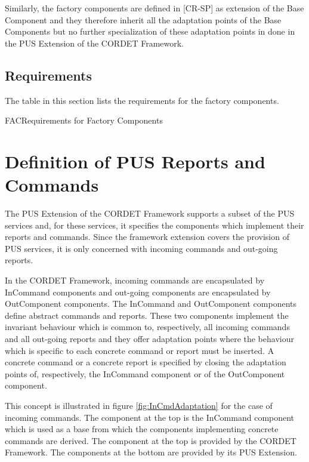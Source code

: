 \documentclass[a4paper,10pt]{article}
\let\stdsection\section
\renewcommand\section{\newpage\stdsection}
\newenvironment{cr_req}[2]
{
\begin{longtable}{|l|p{11.8cm}|}
\caption{#2}\label{tab:Req-#1} \\
\hline
\rowcolor{light-gray}
\textbf{Req. ID} & \textbf{Requirement Text}\\
\hline\hline
\endfirsthead
\rowcolor{light-gray}
\textbf{Req. ID} & \textbf{Requirement Text}\\
\hline\hline
\endhead
\DTLforeach*[\DTLiseq{\cat}{#1}]{dbReq}{\cat=Category,\type=Type,\id=Id,\reqText=Text}
{\DTLiffirstrow{}{\\\hline}P-\cat-\id/\type & \textit{\reqText}}\\\hline
}
{\end{longtable}}
\begin{document}
Similarly, the factory components are defined in [CR-SP] as extension of the Base Component and they therefore inherit all the adaptation points of the Base Components but no further specialization of these adaptation points in done in the PUS Extension of the CORDET Framework.

\subsection{Requirements}
The table in this section lists the requirements for the factory components.

\begin{cr_req}{FAC}{Requirements for Factory Components}
\end{cr_req}


\section{Definition of PUS Reports and Commands}\label{sec:defPusRepCmd}
The PUS Extension of the CORDET Framework supports a subset of the PUS services and, for these services, it specifies the components which implement their reports and commands. Since the framework extension covers the provision of PUS services, it is only concerned with incoming commands and out-going reports. 

In the CORDET Framework, incoming commands are encapsulated by InCommand components and out-going components are encapsulated by OutComponent components. The InCommand and OutComponent components define abstract commands and reports. These two components implement the invariant behaviour which is common to, respectively, all incoming commands and all out-going reports and they offer adaptation points where the behaviour which is specific to each concrete command or report must be inserted. A concrete command or a concrete report is specified by closing the adaptation points of, respectively, the InCommand component or of the OutComponent component. 

This concept is illustrated in figure \ref{fig:InCmdAdaptation} for the case of incoming commands. The component at the top is the InCommand component which is used as a base from which the components implementing concrete commands are derived. The component at the top is provided by the CORDET Framework. The components at the bottom are provided by its PUS Extension. 
\end{document}
